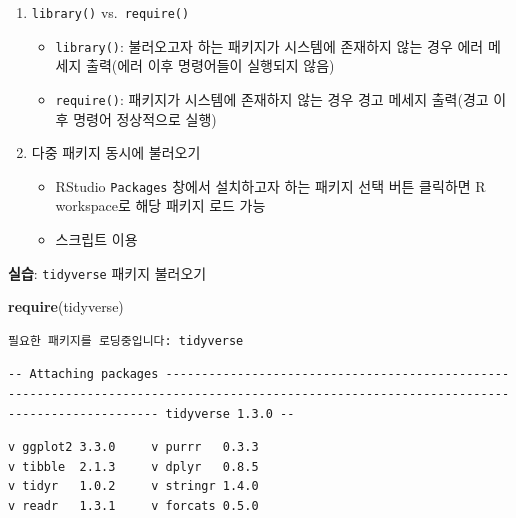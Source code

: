\documentclass[
  11pt,
]{krantz}
\newenvironment{Shaded}{\begin{snugshade}}{\end{snugshade}}
\newcommand{\KeywordTok}[1]{\textcolor[rgb]{0.27,0.27,0.27}{\textbf{#1}}}
\newcommand{\NormalTok}[1]{#1}
\providecommand{\tightlist}{%
  \setlength{\itemsep}{0pt}\setlength{\parskip}{0pt}}
\let\BeginKnitrBlock\begin \let\EndKnitrBlock\end
\begin{document}
\begin{enumerate}
\def\labelenumi{\arabic{enumi}.}
\tightlist
\item
  \texttt{library()} vs.~\texttt{require()}

  \begin{itemize}
  \tightlist
  \item
    \texttt{library()}: 불러오고자 하는 패키지가 시스템에 존재하지 않는 경우 에러 메세지 출력(에러 이후 명령어들이 실행되지 않음)
  \item
    \texttt{require()}: 패키지가 시스템에 존재하지 않는 경우 경고 메세지 출력(경고 이후 명령어 정상적으로 실행)
  \end{itemize}
\item
  다중 패키지 동시에 불러오기

  \begin{itemize}
  \tightlist
  \item
    RStudio \texttt{Packages} 창에서 설치하고자 하는 패키지 선택 버튼 클릭하면 R workspace로 해당 패키지 로드 가능
  \item
    스크립트 이용
  \end{itemize}
\end{enumerate}

\footnotesize

\BeginKnitrBlock{rmdimportant}
\textbf{실습}: \texttt{tidyverse} 패키지 불러오기
\EndKnitrBlock{rmdimportant}

\normalsize

\footnotesize

\begin{Shaded}
\begin{Highlighting}[]
\KeywordTok{require}\NormalTok{(tidyverse)}
\end{Highlighting}
\end{Shaded}

\begin{verbatim}
필요한 패키지를 로딩중입니다: tidyverse
\end{verbatim}

\begin{verbatim}
-- Attaching packages ------------------------------------------------------------------------------------------------------------------------------------------- tidyverse 1.3.0 --
\end{verbatim}

\begin{verbatim}
v ggplot2 3.3.0     v purrr   0.3.3
v tibble  2.1.3     v dplyr   0.8.5
v tidyr   1.0.2     v stringr 1.4.0
v readr   1.3.1     v forcats 0.5.0
\end{verbatim}
\end{document}
